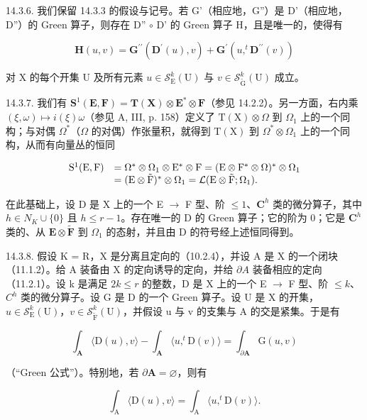 14.3.6. 我们保留 14.3.3 的假设与记号。若 G'（相应地，G''）是 D'（相应地，D''）的 Green 算子，则存在 D'' \(\circ\) D' 的 Green 算子 H，且是唯一的，使得有

\[
\mathbf {H} (u, v) = \mathbf {G} ^ {\prime \prime} (\mathbf {D} ^ {\prime} (u), v) + \mathbf {G} ^ {\prime} (u, ^ {t} \mathbf {D} ^ {\prime \prime} (v))
\]

对 X 的每个开集 U 及所有元素 \(u \in \mathcal{S}_{\mathrm{E}}^{k}(\mathrm{U})\) 与 \(v \in \mathcal{S}_{\widetilde{\mathrm{G}}}^{k}(\mathrm{U})\) 成立。

14.3.7. 我们有 \(\mathbf{S}^1 (\mathbf{E},\mathbf{F}) = \mathbf{T}(\mathbf{X})\otimes \mathbf{E}^*\otimes \mathbf{F}\)（参见 14.2.2）。另一方面，右内乘 \((\xi ,\omega)\mapsto i(\xi)\omega\)（参见 A, III, p. 158）定义了 \(\mathrm{T(X)}\otimes \Omega\) 到 \(\Omega_{1}\) 上的一个同构；与对偶 \(\Omega^{*}\)（\(\Omega\) 的对偶）作张量积，就得到 \(\mathrm{T(X)}\) 到 \(\Omega^{*}\otimes \Omega_{1}\) 上的一个同构，从而有向量丛的恒同

\[
\begin{array}{r l} \mathrm{S} ^ {1} (\mathrm{E}, \mathrm{F}) & = \Omega^ {*} \otimes \Omega_ {1} \otimes \mathrm{E} ^ {*} \otimes \mathrm{F} = (\mathrm{E} \otimes \mathrm{F} ^ {*} \otimes \Omega) ^ {*} \otimes \Omega_ {1} \\ & = (\mathrm{E} \otimes \tilde {\mathrm{F}}) ^ {*} \otimes \Omega_ {1} = \mathcal {L} (\mathrm{E} \otimes \tilde {\mathrm{F}}; \Omega_ {1}). \end{array}
\]

在此基础上，设 D 是 X 上的一个 E \(\to\) F 型、阶 \(\leqslant1\)、\(\mathbf{C}^{h}\) 类的微分算子，其中 \(h \in N_{K} \cup \{0\}\) 且 \(h \leqslant r-1\)。存在唯一的 D 的 Green 算子；它的阶为 0；它是 \(\mathbf{C}^{h}\) 类的、从 \(\mathbf{E}\otimes\widetilde{\mathbf{F}}\) 到 \(\Omega_{1}\) 的态射，并且由 D 的符号经上述恒同得到。

14.3.8. 假设 K = R，X 是分离且定向的（10.2.4），并设 A 是 X 的一个闭块（11.1.2）。给 A 装备由 X 的定向诱导的定向，并给 \(\partial A\) 装备相应的定向（11.2.1）。设 k 是满足 \(2k \leqslant r\) 的整数，D 是 X 上的一个 E \(\to\) F 型、阶 \(\leqslant k\)、\(C^{h}\) 类的微分算子。设 G 是 D 的一个 Green 算子。设 U 是 X 的开集，\(u \in \mathcal{S}_{\mathrm{E}}^{k}(\mathrm{U})\)，\(v \in \mathcal{S}_{\widetilde{\mathrm{F}}}^{k}(\mathrm{U})\)，并假设 u 与 v 的支集与 A 的交是紧集。于是有

\[
\int_ {\mathbf {A}} \langle \mathrm{D} (u), v \rangle - \int_ {\mathbf {A}} \langle u, ^ {t} \mathrm{D} (v) \rangle = \int_ {\partial \mathbf {A}} \mathrm{G} (u, v)
\]

（“Green 公式”）。特别地，若 \(\partial\mathbf{A}=\varnothing\)，则有

\[
\int_ {\mathrm{A}} \langle \mathrm{D} (u), v \rangle = \int_ {\mathrm{A}} \langle u, ^ {t} \mathrm{D} (v) \rangle .
\]


